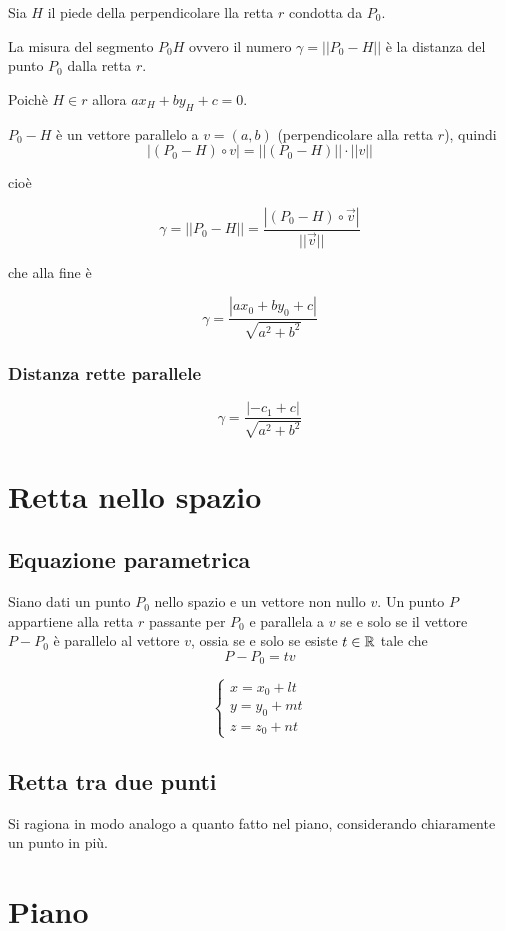 Sia $H$ il piede della perpendicolare lla retta $r$ condotta da $P_0$.

La misura del segmento $P_0H$ ovvero il numero $\gamma = ||P_0-H||$ è la distanza del punto $P_0$ dalla retta $r$.

Poichè $H \in r$ allora $ax_H+by_H+c=0$.

$P_0-H$ è un vettore parallelo a $v=(a,b)$ (perpendicolare alla retta $r$), quindi $$|(P_0-H) \circ v| = ||(P_0-H)|| \cdot ||v||$$

cioè

$$\gamma = ||P_0-H|| = \frac{|(P_0-H)\circ \vec{v}|}{||\vec{v}||}$$

che alla fine è

$$\gamma = \frac{|ax_0+by_0+c|}{\sqrt{a^2+b^2}}$$

\subsubsection{Distanza rette parallele}

$$\gamma = \frac{|-c_1 + c|}{\sqrt{a^2+b^2}}$$

\section{Retta nello spazio}

\subsection{Equazione parametrica}

Siano dati un punto $P_0$ nello spazio e un vettore non nullo $v$. Un punto $P$ appartiene alla retta $r$ passante per $P_0$ e parallela a $v$ se e solo se il vettore $P-P_0$ è parallelo al vettore $v$, ossia se e solo se esiste $t \in \mathbb{R}$ tale che $$P-P_0=tv$$

$$
\begin{cases}
x = x_0 + lt \\
y = y_0 + mt \\
z = z_0 + nt
\end{cases}
$$

\subsection{Retta tra due punti}

Si ragiona in modo analogo a quanto fatto nel piano, considerando chiaramente un punto in più.

\section{Piano}

